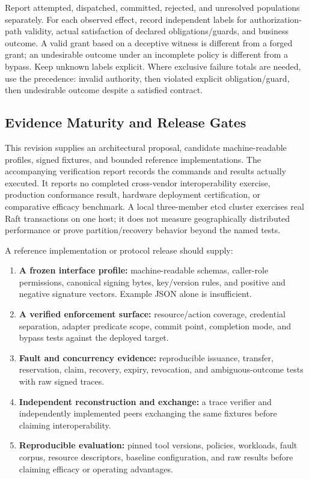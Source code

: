 Report attempted, dispatched, committed, rejected, and unresolved populations separately. For each observed effect, record independent labels for authorization-path validity, actual satisfaction of declared obligations/guards, and business outcome. A valid grant based on a deceptive witness is different from a forged grant; an undesirable outcome under an incomplete policy is different from a bypass. Keep unknown labels explicit. Where exclusive failure totals are needed, use the precedence: invalid authority, then violated explicit obligation/guard, then undesirable outcome despite a satisfied contract.

\subsection{Evidence Maturity and Release Gates}

This revision supplies an architectural proposal, candidate machine-readable profiles, signed fixtures, and bounded reference implementations. The accompanying verification report records the commands and results actually executed. It reports no completed cross-vendor interoperability exercise, production conformance result, hardware deployment certification, or comparative efficacy benchmark. A local three-member etcd cluster exercises real Raft transactions on one host; it does not measure geographically distributed performance or prove partition/recovery behavior beyond the named tests.

A reference implementation or protocol release should supply:
\begin{enumerate}
\item \textbf{A frozen interface profile:} machine-readable schemas, caller-role permissions, canonical signing bytes, key/version rules, and positive and negative signature vectors. Example JSON alone is insufficient.
\item \textbf{A verified enforcement surface:} resource/action coverage, credential separation, adapter predicate scope, commit point, completion mode, and bypass tests against the deployed target.
\item \textbf{Fault and concurrency evidence:} reproducible issuance, transfer, reservation, claim, recovery, expiry, revocation, and ambiguous-outcome tests with raw signed traces.
\item \textbf{Independent reconstruction and exchange:} a trace verifier and independently implemented peers exchanging the same fixtures before claiming interoperability.
\item \textbf{Reproducible evaluation:} pinned tool versions, policies, workloads, fault corpus, resource descriptors, baseline configuration, and raw results before claiming efficacy or operating advantages.
\end{enumerate}

